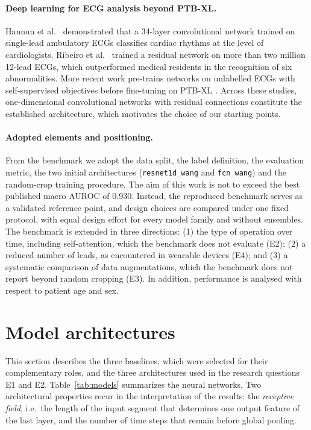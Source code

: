 \documentclass{article}
\newcommand{\wang}{\texttt{resnet1d\_wang}}
\newcommand{\fcnwang}{\texttt{fcn\_wang}}
\begin{document}
\paragraph{Deep learning for ECG analysis beyond PTB-XL.} Hannun et al.\ \citep{hannun2019} demonstrated that a 34-layer convolutional network trained on single-lead ambulatory ECGs classifies cardiac rhythms at the level of cardiologists. Ribeiro et al.\ \citep{ribeiro2020} trained a residual network on more than two million 12-lead ECGs, which outperformed medical residents in the recognition of six abnormalities. More recent work pre-trains networks on unlabelled ECGs with self-supervised objectives before fine-tuning on PTB-XL \citep{mehari2022}. Across these studies, one-dimensional convolutional networks with residual connections constitute the established architecture, which motivates the choice of our starting points.

\paragraph{Adopted elements and positioning.} From the benchmark we adopt the data split, the label definition, the evaluation metric, the two initial architectures (\wang{} and \fcnwang{}) and the random-crop training procedure. The aim of this work is not to exceed the best published macro AUROC of 0.930. Instead, the reproduced benchmark serves as a validated reference point, and design choices are compared under one fixed protocol, with equal design effort for every model family and without ensembles. The benchmark is extended in three directions: (1) the type of operation over time, including self-attention, which the benchmark does not evaluate (E2); (2) a reduced number of leads, as encountered in wearable devices (E4); and (3) a systematic comparison of data augmentations, which the benchmark does not report beyond random cropping (E3). In addition, performance is analysed with respect to patient age and sex.

\section{Model architectures}
\label{sec:models}

This section describes the three baselines, which were selected for their complementary roles, and the three architectures used in the research questions E1 and E2. Table~\ref{tab:models} summarizes the neural networks. Two architectural properties recur in the interpretation of the results: the \emph{receptive field}, i.e.\ the length of the input segment that determines one output feature of the last layer, and the number of time steps that remain before global pooling.
\end{document}
